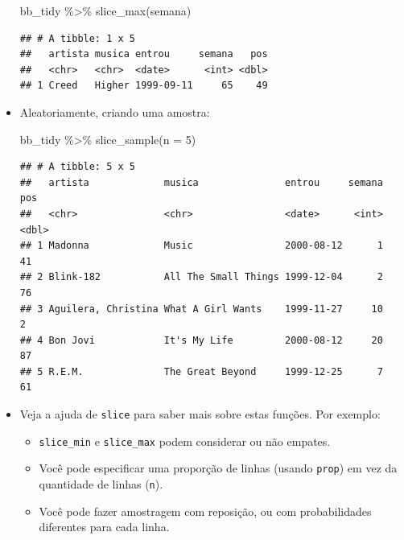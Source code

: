 \documentclass[
  11pt]{report}
\newenvironment{Shaded}{\begin{snugshade}}{\end{snugshade}}
\newcommand{\AttributeTok}[1]{\textcolor[rgb]{0.77,0.63,0.00}{#1}}
\newcommand{\DecValTok}[1]{\textcolor[rgb]{0.00,0.00,0.81}{#1}}
\newcommand{\FunctionTok}[1]{\textcolor[rgb]{0.00,0.00,0.00}{#1}}
\newcommand{\NormalTok}[1]{#1}
\newcommand{\SpecialCharTok}[1]{\textcolor[rgb]{0.00,0.00,0.00}{#1}}
\renewenvironment{Shaded}{
    \begin{mdframed}[%
      roundcorner=2pt,%
      innerleftmargin=5pt,%
      innerrightmargin=5pt,%
      topline=true,%
      leftline=true,%
      rightline=true,%
      bottomline=true,%
      linewidth=0.5pt,%
      linecolor=black!20,%
      backgroundcolor=black!2,%
      skipabove=2ex,%
      skipbelow=2.5ex%
    ]%
  }
  {
    \end{mdframed}
  }
\begin{document}
\begin{itemize}
\begin{Shaded}
\begin{Highlighting}[]
\NormalTok{bb\_tidy }\SpecialCharTok{\%\textgreater{}\%} 
  \FunctionTok{slice\_max}\NormalTok{(semana)}
\end{Highlighting}
\end{Shaded}

\begin{verbatim}
## # A tibble: 1 x 5
##   artista musica entrou     semana   pos
##   <chr>   <chr>  <date>      <int> <dbl>
## 1 Creed   Higher 1999-09-11     65    49
\end{verbatim}
\item
  Aleatoriamente, criando uma amostra:

\begin{Shaded}
\begin{Highlighting}[]
\NormalTok{bb\_tidy }\SpecialCharTok{\%\textgreater{}\%} 
  \FunctionTok{slice\_sample}\NormalTok{(}\AttributeTok{n =} \DecValTok{5}\NormalTok{)}
\end{Highlighting}
\end{Shaded}

\begin{verbatim}
## # A tibble: 5 x 5
##   artista             musica               entrou     semana   pos
##   <chr>               <chr>                <date>      <int> <dbl>
## 1 Madonna             Music                2000-08-12      1    41
## 2 Blink-182           All The Small Things 1999-12-04      2    76
## 3 Aguilera, Christina What A Girl Wants    1999-11-27     10     2
## 4 Bon Jovi            It's My Life         2000-08-12     20    87
## 5 R.E.M.              The Great Beyond     1999-12-25      7    61
\end{verbatim}
\item
  Veja a ajuda de \texttt{slice} para saber mais sobre estas funções. Por exemplo:

  \begin{itemize}
  \item
    \texttt{slice\_min} e \texttt{slice\_max} podem considerar ou não empates.
  \item
    Você pode especificar uma proporção de linhas (usando \texttt{prop}) em vez da quantidade de linhas (\texttt{n}).
  \item
    Você pode fazer amostragem com reposição, ou com probabilidades diferentes para cada linha.
  \end{itemize}
\end{itemize}
\end{document}
